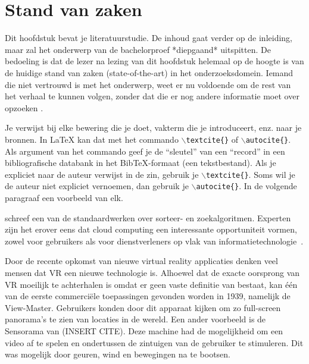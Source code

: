 \chapter{Stand van zaken}
\label{ch:stand-van-zaken}



Dit hoofdstuk bevat je literatuurstudie. De inhoud gaat verder op de inleiding, maar zal het onderwerp van de bachelorproef *diepgaand* uitspitten. De bedoeling is dat de lezer na lezing van dit hoofdstuk helemaal op de hoogte is van de huidige stand van zaken (state-of-the-art) in het onderzoeksdomein. Iemand die niet vertrouwd is met het onderwerp, weet er nu voldoende om de rest van het verhaal te kunnen volgen, zonder dat die er nog andere informatie moet over opzoeken \autocite{Pollefliet2011}.

Je verwijst bij elke bewering die je doet, vakterm die je introduceert, enz. naar je bronnen. In \LaTeX{} kan dat met het commando \texttt{$\backslash${textcite\{\}}} of \texttt{$\backslash${autocite\{\}}}. Als argument van het commando geef je de ``sleutel'' van een ``record'' in een bibliografische databank in het Bib\TeX{}-formaat (een tekstbestand). Als je expliciet naar de auteur verwijst in de zin, gebruik je \texttt{$\backslash${}textcite\{\}}.
Soms wil je de auteur niet expliciet vernoemen, dan gebruik je \texttt{$\backslash${}autocite\{\}}. In de volgende paragraaf een voorbeeld van elk.

\textcite{Knuth1998} schreef een van de standaardwerken over sorteer- en zoekalgoritmen. Experten zijn het erover eens dat cloud computing een interessante opportuniteit vormen, zowel voor gebruikers als voor dienstverleners op vlak van informatietechnologie~\autocite{Creeger2009}.

Door de recente opkomst van nieuwe virtual reality applicaties denken veel mensen dat VR een nieuwe technologie is. Alhoewel dat de exacte oorsprong van VR moeilijk te achterhalen is omdat er geen vaste definitie van bestaat, kan één van de eerste commerciële toepassingen gevonden worden in 1939, namelijk de View-Master. Gebruikers konden door dit apparaat kijken om zo full-screen panorama's te zien van locaties in de wereld. Een ander voorbeeld is de Sensorama van (INSERT CITE). Deze machine had de mogelijkheid om een video af te spelen en ondertussen de zintuigen van de gebruiker te stimuleren. Dit was mogelijk door geuren, wind en bewegingen na te bootsen.

